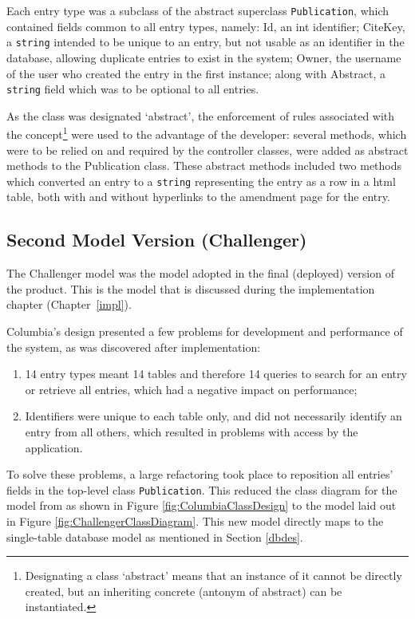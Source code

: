 Each entry type was a subclass of the abstract superclass \texttt{Publication}, which contained fields common to all entry types, namely: Id, an int identifier; CiteKey, a \texttt{string} intended to be unique to an entry, but not usable as an identifier in the database, allowing duplicate entries to exist in the system; Owner, the username of the user who created the entry in the first instance; along with Abstract, a \texttt{string} field which was to be optional to all entries.

As the class was designated `abstract', the enforcement of rules associated with the concept\footnote{Designating a class `abstract' means that an instance of it cannot be directly created, but an inheriting concrete (antonym of abstract) can be instantiated.} were used to the advantage of the developer: several methods, which were to be relied on and required by the controller classes, were added as abstract methods to the Publication class.  These abstract methods included two methods which converted an entry to a \texttt{string} representing the entry as a row in a \gls{html} table, both with and without hyperlinks to the amendment page for the entry.


\subsection{Second Model Version (Challenger)}
\label{designChallenger}
The Challenger model was the model adopted in the final (deployed) version of the product.  This is the model that is discussed during the implementation chapter (Chapter~\ref{impl}).

Columbia's design presented a few problems for development and performance of the system, as was discovered after implementation:
\begin{enumerate}
	\item 14 entry types meant 14 tables and therefore 14 queries to search for an entry or retrieve all entries, which had a negative impact on performance;
	\item Identifiers were unique to each table only, and did not necessarily identify an entry from all others, which resulted in problems with access by the application.
\end{enumerate}

To solve these problems, a large refactoring took place to reposition all entries' fields in the top-level class \texttt{Publication}.  This reduced the class diagram for the model from as shown in Figure \ref{fig:ColumbiaClassDesign} to the model laid out in Figure \ref{fig:ChallengerClassDiagram}.  This new model directly maps to the single-table database model as mentioned in Section \ref{dbdes}.

